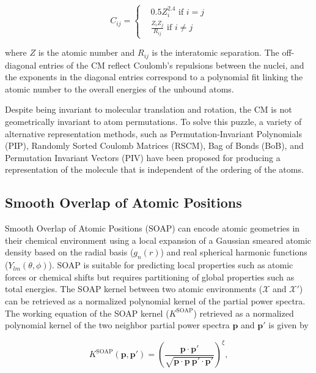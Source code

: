 \begin{equation}
C_{ij} =
\begin{cases}
 & 0.5 Z_i^{2.4} \text{ if } i = j \\ 
 & \frac{Z_i Z_j}{R_{ij}} \text{ if } i \neq j
\end{cases}
\end{equation}

\noindent where $Z$ is the atomic number and $R_{ij}$ is the interatomic separation. The off-diagonal entries 
of the CM reflect Coulomb's repulsions between the nuclei, and the exponents in the diagonal entries 
correspond to a polynomial fit linking the atomic number to the overall energies of the unbound atoms. 

Despite being invariant to molecular translation and rotation, the CM is not geometrically invariant to 
atom permutations. To solve this puzzle, a variety of alternative representation methods, such as 
Permutation-Invariant Polynomials (PIP)\cite{braams2009}, Randomly Sorted Coulomb Matrices (RSCM)\cite{hansen2013}, 
Bag of Bonds (BoB)\cite{hansen2013}, and Permutation Invariant Vectors (PIV)\cite{gallet2013} have been 
proposed for producing a representation of the molecule that is independent of the ordering of the atoms.

\subsection{Smooth Overlap of Atomic Positions}

Smooth Overlap of Atomic Positions (SOAP) can encode atomic geometries in their chemical environment 
using a local expansion of a Gaussian smeared atomic density based on the radial basis ($g_{n}(r)$) and 
real spherical harmonic functions ($Y_{lm}(\theta, \phi)$).\cite{bartok2013,de2016} SOAP is suitable for predicting 
local properties such as atomic forces or chemical shifts but requires partitioning of global properties 
such as total energies. The SOAP kernel between two atomic environments ($\mathcal{X}$ and $\mathcal{X}'$) 
can be retrieved as a normalized polynomial kernel of the partial power spectra. The working equation of 
the SOAP kernel ($K^\mathrm{SOAP}$) retrieved as a normalized polynomial kernel of the two neighbor partial 
power spectra $\mathbf{p}$ and $\mathbf{p}'$ is given by

\begin{equation}
    K^\mathrm{SOAP}(\mathbf{p}, \mathbf{p'}) = \left( \frac{\mathbf{p} \cdot \mathbf{p'}}{\sqrt{\mathbf{p} 
    \cdot \mathbf{p}~\mathbf{p'} \cdot \mathbf{p'}}}\right)^{\xi},
\end{equation}

